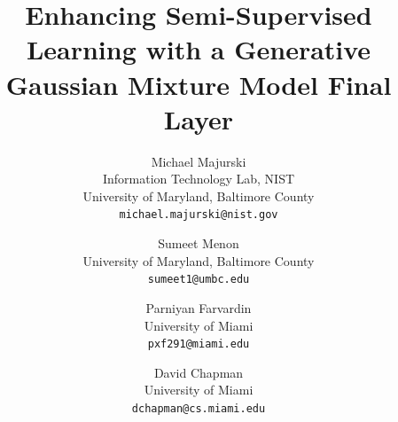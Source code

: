 \documentclass[10pt,twocolumn,letterpaper]{article}
\begin{document}
	
	\title{Enhancing Semi-Supervised Learning with a Generative Gaussian Mixture Model Final Layer}
	
	
	\author{Michael Majurski\\
		Information Technology Lab, NIST\\
		University of Maryland, Baltimore County\\
		{\tt\small michael.majurski@nist.gov}
	\and
	Sumeet Menon\\
	University of Maryland, Baltimore County\\
	{\tt\small sumeet1@umbc.edu}
	\and
	Parniyan Farvardin\\
	University of Miami\\
	{\tt\small pxf291@miami.edu}
	\and
	David Chapman\\
	University of Miami\\
	{\tt\small dchapman@cs.miami.edu}
}

\maketitle
\end{document}
